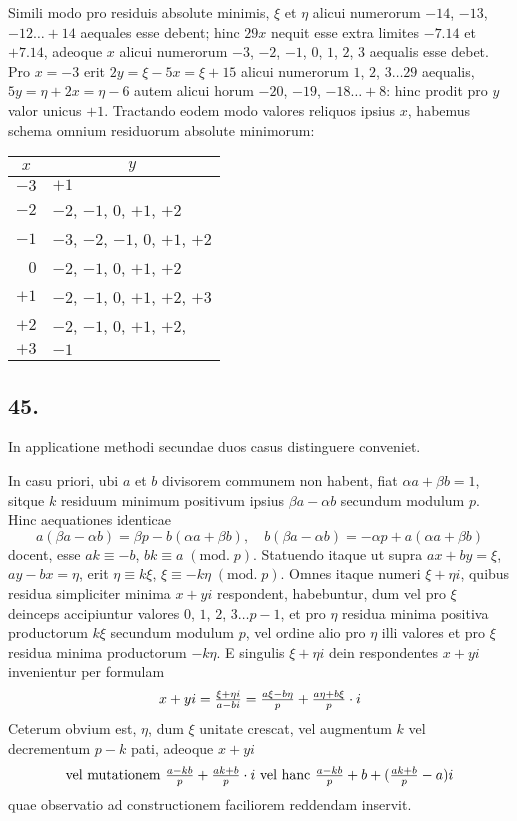\documentclass[twoside,12pt]{memoir}
\renewcommand{\pmod}[1]{\;(\textrm{mod.}\;#1)}
\let\oldfrac\frac
\def\frac#1#2{\mathchoice{\tfrac{#1}{#2}}{\oldfrac{#1}{#2}}{\genfrac{}{}{}{2}{#1}{#2\mathstrut}}{\genfrac{}{}{}{3}{#1}{#2\mathstrut}}}
\begin{document}
Simili modo pro residuis absolute minimis, \(\xi\) et \(\eta\) alicui numerorum \(-14\), \(-13\), \(-12 \ldots+14\) aequales esse debent; hinc \(29 x\) nequit esse extra limites \(-7.14\) et \(+7.14\), adeoque \(x\) alicui numerorum \(-3\), \(-2\), \(-1\), \(0\), \(1\), \(2\), \(3\) aequalis esse debet. Pro \(x=-3\) erit \(2 y=\xi-5 x=\xi+15\) alicui numerorum \(1\), \(2\), \(3 \ldots 29\) aequalis, \(5 y=\eta+2 x=\eta-6\) autem alicui horum \(-20\), \(-19\), \(-18 \ldots+8\): hinc prodit pro \(y\) valor unicus \(+1\). Tractando eodem modo valores reliquos ipsius \(x\), habemus schema omnium residuorum absolute minimorum:
\begin{center}
\begin{tabular}{r|l}
\multicolumn{1}{c|}{\(x\)} & \multicolumn{1}{c}{\(y\)} \\
\hline
\(-3\) & \(+1\) \\
\(-2\) & \(-2\), \(-1\), \(0\), \(+1\), \(+2\) \\
\(-1\) & \(-3\), \(-2\), \(-1\), \(0\), \(+1\), \(+2\) \\
\(0\) & \(-2\), \(-1\), \(0\), \(+1\), \(+2\) \\
\(+1\) & \(-2\), \(-1\), \(0\), \(+1\), \(+2\), \(+3\) \\
\(+2\) & \(-2\), \(-1\), \(0\), \(+1\), \(+2\), \\
\(+3\) & \(-1\) \\
\end{tabular}
\end{center}

\subsection*{45.}
 
In applicatione methodi secundae duos casus distinguere conveniet.
 
In casu priori, ubi \(a\) et \(b\) divisorem communem non habent, fiat \(\alpha a+\beta b=1\), sitque \(k\) residuum minimum positivum ipsius \(\beta a-\alpha b\) secundum modulum \(p\). Hinc aequationes identicae
\[a(\beta a-\alpha b)=\beta p-b(\alpha a+\beta b), \quad b(\beta a-\alpha b)=-\alpha p+a(\alpha a+\beta b)\]
docent, esse \(a k \equiv-b\), \(b k \equiv a\pmod{p}\). Statuendo itaque ut supra \(a x+b y=\xi\),\pagebreak%
\(a y-b x=\eta\), erit \(\eta \equiv k \xi\), \(\xi \equiv-k \eta\pmod{p}\). Omnes itaque numeri \(\xi+\eta i\), quibus residua simpliciter minima \(x+y i\) respondent, habebuntur, dum vel pro \(\xi\) deinceps accipiuntur valores \(0\), \(1\), \(2\), \(3 \ldots p-1\), et pro \(\eta\) residua minima positiva productorum \(k \xi\) secundum modulum \(p\), vel ordine alio pro \(\eta\) illi valores et pro \(\xi\) residua minima productorum \(-k \eta\). E singulis \(\xi+\eta i\) dein respondentes \(x+y i\) invenientur per formulam
\[x+y i=\frac{\xi+\eta i}{a-b i}=\frac{a \xi-b \eta}{p}+\frac{a \eta+b \xi}{p} \cdot i\]
Ceterum obvium est, \(\eta\), dum \(\xi\) unitate crescat, vel augmentum \(k\) vel decrementum \(p-k\) pati, adeoque \(x+y i\)
\[\text{vel mutationem }\frac{a-k b}{p}+\frac{a k+b}{p} \cdot i\text{ vel hanc }\frac{a-k b}{p}+b+(\frac{a k+b}{p}-a) i\]
quae observatio ad constructionem faciliorem reddendam inservit.
\end{document}
